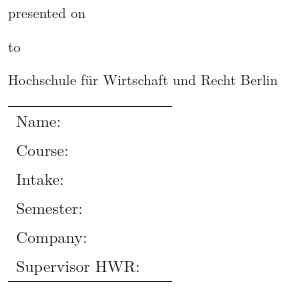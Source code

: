 
\thispagestyle{empty}

\begin{center}
	\huge\topic

	
	\vspace{1.5cm}
	\normalsize{
	\type

	\vspace{1.5cm}
	presented on \dateofsubmission 

	\vspace{1.5cm}
	to

	\vspace{1.5cm}
	Hochschule für Wirtschaft und Recht Berlin
}

\end{center}	

\vspace{1.5cm}

\renewcommand{\arraystretch}{2}
\begin{tabular}{l l}
	Name: & \studentfirstname~\studentlastname \tabularnewline
	Course: & \course \tabularnewline
	Intake: & \intake \tabularnewline
	Semester: & \semester \tabularnewline
	Company: & \company \tabularnewline
	Supervisor HWR: & \supervisorhwr \tabularnewline
\end{tabular}

	
